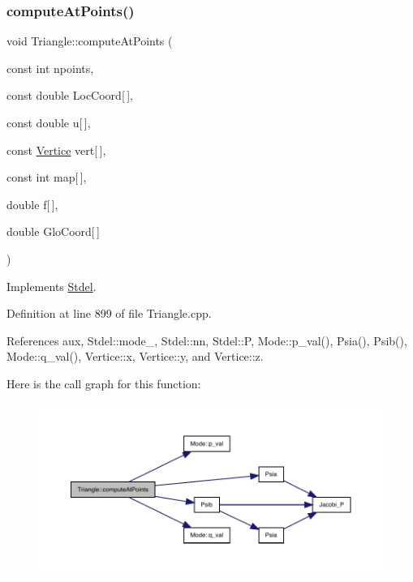 \subsubsection{\texorpdfstring{compute\+At\+Points()}{computeAtPoints()}}
{\footnotesize\ttfamily void Triangle\+::compute\+At\+Points (\begin{DoxyParamCaption}\item[{const int}]{npoints,  }\item[{const double}]{Loc\+Coord\mbox{[}$\,$\mbox{]},  }\item[{const double}]{u\mbox{[}$\,$\mbox{]},  }\item[{const \hyperlink{structVertice}{Vertice}}]{vert\mbox{[}$\,$\mbox{]},  }\item[{const int}]{map\mbox{[}$\,$\mbox{]},  }\item[{double}]{f\mbox{[}$\,$\mbox{]},  }\item[{double}]{Glo\+Coord\mbox{[}$\,$\mbox{]} }\end{DoxyParamCaption})\hspace{0.3cm}{\ttfamily [virtual]}}



Implements \hyperlink{classStdel_a03e038055d238608efce470629863c36}{Stdel}.



Definition at line 899 of file Triangle.\+cpp.



References aux, Stdel\+::mode\+\_\+, Stdel\+::nn, Stdel\+::P, Mode\+::p\+\_\+val(), Psia(), Psib(), Mode\+::q\+\_\+val(), Vertice\+::x, Vertice\+::y, and Vertice\+::z.

Here is the call graph for this function\+:
\nopagebreak
\begin{figure}[H]
\begin{center}
\leavevmode
\includegraphics[width=350pt]{classTriangle_a1884216b14c0432a2a56c12da809fb37_cgraph}
\end{center}
\end{figure}
\mbox{\label{classTriangle_ac5aa1a7a531b50d282dbe740efbb9919}} 
